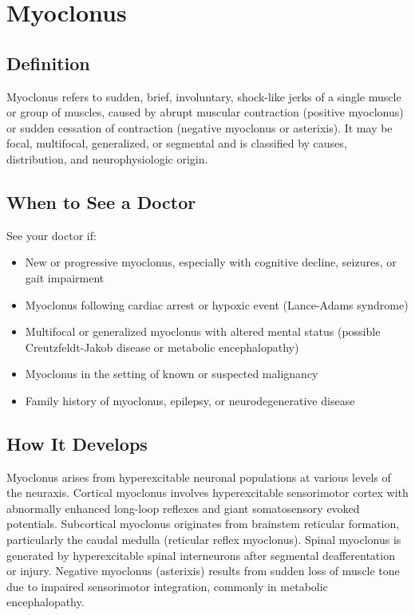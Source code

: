 \chapter{Myoclonus}

\section*{Definition}
Myoclonus refers to sudden, brief, involuntary, shock-like jerks of a single muscle or group of muscles, caused by abrupt muscular contraction (positive myoclonus) or sudden cessation of contraction (negative myoclonus or asterixis). It may be focal, multifocal, generalized, or segmental and is classified by causes, distribution, and neurophysiologic origin.

\section*{When to See a Doctor}
See your doctor if:
\begin{itemize}
  \item New or progressive myoclonus, especially with cognitive decline, seizures, or gait impairment
  \item Myoclonus following cardiac arrest or hypoxic event (Lance-Adams syndrome)
  \item Multifocal or generalized myoclonus with altered mental status (possible Creutzfeldt-Jakob disease or metabolic encephalopathy)
  \item Myoclonus in the setting of known or suspected malignancy
  \item Family history of myoclonus, epilepsy, or neurodegenerative disease
\end{itemize}

\section*{How It Develops}
Myoclonus arises from hyperexcitable neuronal populations at various levels of the neuraxis. Cortical myoclonus involves hyperexcitable sensorimotor cortex with abnormally enhanced long-loop reflexes and giant somatosensory evoked potentials. Subcortical myoclonus originates from brainstem reticular formation, particularly the caudal medulla (reticular reflex myoclonus). Spinal myoclonus is generated by hyperexcitable spinal interneurons after segmental deafferentation or injury. Negative myoclonus (asterixis) results from sudden loss of muscle tone due to impaired sensorimotor integration, commonly in metabolic encephalopathy.


